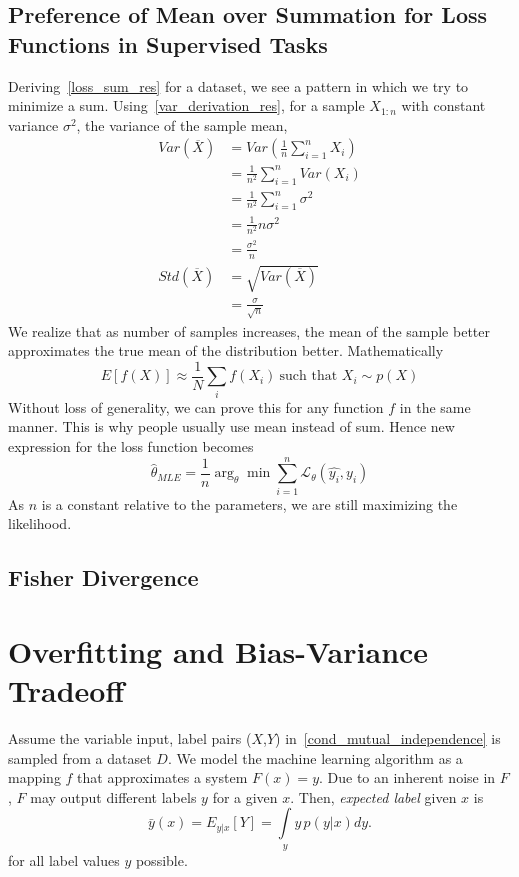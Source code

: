 \documentclass{book}
\numberwithin{equation}{subsection}
\begin{document}
\subsection{Preference of Mean over Summation for Loss Functions in Supervised Tasks}
\label{mean_loss}
Deriving~\ref{loss_sum_res} for a dataset, we see a pattern in which we try to minimize a sum.
Using~\ref{var_derivation_res}, for a sample $X_{1:n}$ with constant variance $\sigma^2$, the variance of the sample mean,
\begin{align}
    Var(\overline{X}) &= Var(\frac{1}{n}\sum_{i=1}^{n} X_i)\\
    &= \frac{1}{n^2} \sum_{i=1}^{n} Var(X_i)\\
    &= \frac{1}{n^2} \sum_{i=1}^{n} \sigma^2\\
    &= \frac{1}{n^2} n \sigma^2\\
    &= \frac{\sigma^2}{n}\\
    Std(\overline{X}) &= \sqrt{Var(\overline{X})}\\
    &= \frac{\sigma}{\sqrt{n}}
\end{align}
We realize that as number of samples increases, the mean of the sample better approximates the true mean of the distribution better. Mathematically
\begin{equation}
    E[f(X)] \approx \frac{1}{N}\sum_i f(X_i)\ \text{such that $X_i \sim p(X)$}\label{mean_loss_res}
\end{equation}
Without loss of generality, we can prove this for any function $f$ in the same manner. This is why people usually use mean instead of sum. Hence new expression for the loss function becomes
\begin{equation}
    \hat{\theta}_{MLE} = \frac{1}{n}\arg_\theta \min \sum_{i=1}^n \mathcal{L}_\theta(\hat{y_i},y_i)
\end{equation}
As $n$ is a constant relative to the parameters, we are still maximizing the likelihood.
\subsection{Fisher Divergence}

\section{Overfitting and Bias-Variance Tradeoff}

Assume the variable input, label pairs ($X$,$Y$) in~\ref{cond_mutual_independence} is sampled from a dataset $D$. We model the machine learning algorithm as a mapping $f$ that approximates a system $F(x)=y$. Due to an inherent noise in $F$, $F$ may output different labels $y$ for a given $x$. Then, \textit{expected label} given $x$ is
\begin{equation}
    \bar{y}(x) = E_{y \vert x} \left[Y\right] = \int\limits_y y \, p(y \vert x) dy.
\end{equation}
for all label values $y$ possible.
\end{document}
